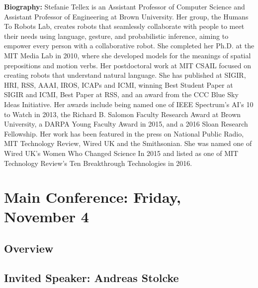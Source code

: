 \vfill{}
\noindent \textbf{Biography:}  
 Stefanie Tellex is an Assistant Professor of Computer Science and Assistant Professor of Engineering at Brown University. Her group, the Humans To Robots Lab, creates robots that seamlessly collaborate with people to meet their needs using language, gesture, and probabilistic inference, aiming to empower every person with a collaborative robot. She completed her Ph.D. at the MIT Media Lab in 2010, where she developed models for the meanings of spatial prepositions and motion verbs. Her postdoctoral work at MIT CSAIL focused on creating robots that understand natural language. She has published at SIGIR, HRI, RSS, AAAI, IROS, ICAPs and ICMI, winning Best Student Paper at SIGIR and ICMI, Best Paper at RSS, and an award from the CCC Blue Sky Ideas Initiative. Her awards include being named one of IEEE Spectrum's AI's 10 to Watch in 2013, the Richard B. Salomon Faculty Research Award at Brown University, a DARPA Young Faculty Award in 2015, and a 2016 Sloan Research Fellowship. Her work has been featured in the press on National Public Radio, MIT Technology Review, Wired UK and the Smithsonian. She was named one of Wired UK's Women Who Changed Science In 2015 and listed as one of MIT Technology Review's Ten Breakthrough Technologies in 2016. 
\clearpage{}









%



\chapter{Main Conference: Friday, November 4}
\thispagestyle{emptyheader}
\section*{Overview}

\clearpage{}


\section{Invited Speaker: Andreas Stolcke}

